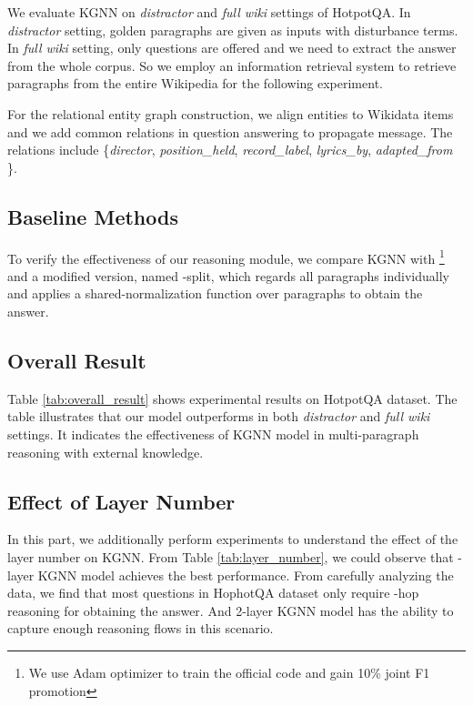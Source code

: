 \documentclass[11pt,a4paper]{article}
\newcommand\OurModel{KGNN\xspace}
\begin{document}
We evaluate \OurModel on \emph{distractor} and \emph{full wiki} settings of HotpotQA. In \emph{distractor} setting,  golden paragraphs are given as inputs with  disturbance terms. In \emph{full wiki} setting, only questions are offered and we need to extract the answer from the whole corpus. So we employ an information retrieval system to retrieve  paragraphs from the entire Wikipedia for the following experiment.

For the relational entity graph construction, we align entities to Wikidata items and we add  common relations in question answering to propagate message. The relations include \{\emph{director}, \emph{position\_held}, \emph{record\_label}, \emph{lyrics\_by}, \emph{adapted\_from} \}.

\subsection{Baseline Methods}
To verify the effectiveness of our reasoning module, we compare \OurModel with \citet{yang2018hotpotqa}\footnote{We use Adam optimizer to train the official code and gain 10\% joint F1 promotion} and a modified version, named \citet{yang2018hotpotqa}-split, which regards all paragraphs individually and applies a shared-normalization function over paragraphs to obtain the answer.

\subsection{Overall Result}

Table \ref{tab:overall_result} shows experimental results on HotpotQA dataset. The table illustrates that our model outperforms \citet{yang2018hotpotqa} in both \emph{distractor} and \emph{full wiki} settings. It indicates the effectiveness of KGNN model in multi-paragraph reasoning with external knowledge.

\subsection{Effect of Layer Number}

In this part, we additionally perform experiments to understand the effect of the layer number on \OurModel. From Table \ref{tab:layer_number}, we could observe that -layer \OurModel model achieves the best performance. From carefully analyzing the data, we find that most questions in HophotQA dataset only require -hop reasoning for obtaining the answer. And 2-layer KGNN model has the ability to capture enough reasoning flows in this scenario.
\end{document}
